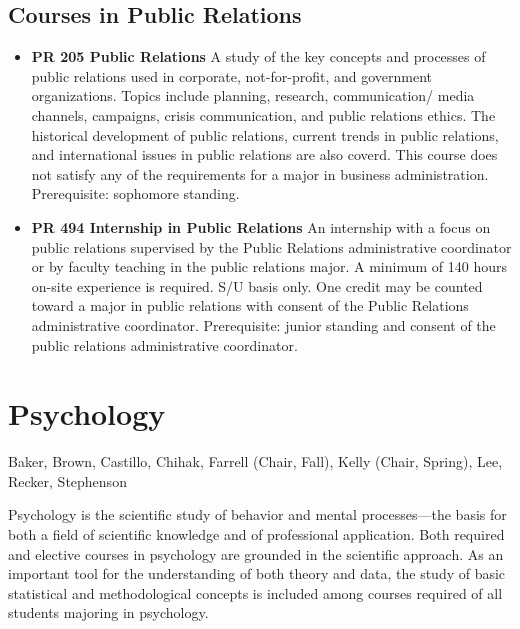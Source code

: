 \documentclass[
  letterpaper,
]{scrbook}
\providecommand{\tightlist}{%
  \setlength{\itemsep}{0pt}\setlength{\parskip}{0pt}}
\begin{document}
\hypertarget{courses-in-public-relations}{%
\subsection{Courses in Public
Relations}\label{courses-in-public-relations}}

\begin{itemize}
\tightlist
\item
  \textbf{PR 205 Public Relations} A study of the key concepts and
  processes of public relations used in corporate, not-for-profit, and
  government organizations. Topics include planning, research,
  communication/ media channels, campaigns, crisis communication, and
  public relations ethics. The historical development of public
  relations, current trends in public relations, and international
  issues in public relations are also coverd. This course does not
  satisfy any of the requirements for a major in business
  administration. Prerequisite: sophomore standing.\\
\item
  \textbf{PR 494 Internship in Public Relations} An internship with a
  focus on public relations supervised by the Public Relations
  administrative coordinator or by faculty teaching in the public
  relations major. A minimum of 140 hours on-site experience is
  required. S/U basis only. One credit may be counted toward a major in
  public relations with consent of the Public Relations administrative
  coordinator. Prerequisite: junior standing and consent of the public
  relations administrative coordinator.
\end{itemize}

\hypertarget{sec-psychology}{%
\section{Psychology}\label{sec-psychology}}

Baker, Brown, Castillo, Chihak, Farrell (Chair, Fall), Kelly (Chair,
Spring), Lee, Recker, Stephenson

Psychology is the scientific study of behavior and mental
processes---the basis for both a field of scientific knowledge and of
professional application. Both required and elective courses in
psychology are grounded in the scientific approach. As an important tool
for the understanding of both theory and data, the study of basic
statistical and methodological concepts is included among courses
required of all students majoring in psychology.
\end{document}
